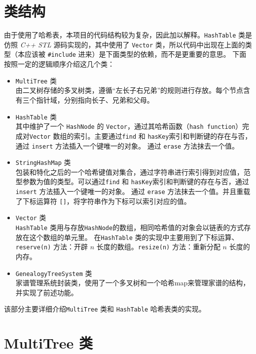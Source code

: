 
\chapter{类结构}
由于使用了哈希表，本项目的代码结构较为复杂，因此加以解释。\lstinline{HashTable} 类是仿照 \emph{C++ STL} 源码实现的，其中使用了%
\lstinline{Vector} 类，所以代码中出现在上面的类型（本应该被 \lstinline{#include} 进来）是下面类型的依赖，而不是更重要的意思。%
下面按照一定的逻辑顺序介绍这几个类：

\begin{itemize}
    \item \lstinline{MultiTree} 类\\
    由二叉树存储的多叉树类，遵循“左长子右兄弟”的规则进行存放。每个节点含有三个指针域，分别指向长子、兄弟和父母。
    \item \lstinline{HashTable} 类\\
    其中维护了一个 \lstinline{HashNode} 的 \lstinline{Vector}，通过其哈希函数（\lstinline{hash function}）完成对\lstinline{Vector}%
    数组的索引。主要通过\lstinline{find} 和 \lstinline{hasKey}索引和判断键的存在与否，通过 \lstinline{insert} 方法插入一个键唯一的对象。%
    通过 \lstinline{erase} 方法抹去一个值。
    \item \lstinline{StringHashMap} 类\\
    包装和特化之后的一个哈希键值对集合，通过字符串进行索引得到对应值，范型参数为值的类型。可以通过\lstinline{find} 和 %
    \lstinline{hasKey}索引和判断键的存在与否，通过 \lstinline{insert} 方法插入一个键唯一的对象。%
    通过 \lstinline{erase} 方法抹去一个值。并且重载了下标运算符 \lstinline{[]}，将字符串作为下标可以索引对应的值。
    \item \lstinline{Vector} 类\\
    \lstinline{HashTable} 类用与存放\lstinline{HashNode}的数组，相同哈希值的对象会以链表的方式存放在这个数组的单元里。%
    在\lstinline{HashTable} 类的实现中主要用到了下标运算、\lstinline{reserve(n)} 方法：开辟 $n$ 长度的数组。\lstinline{resize(n)}%
    方法：重新分配 $n$ 长度的内存。
    \item \lstinline{GenealogyTreeSystem} 类\\
    家谱管理系统封装类，使用了一个多叉树和一个哈希map来管理家谱的结构，并实现了前述功能。
\end{itemize}

该部分主要详细介绍\lstinline{MultiTree} 类和 \lstinline{HashTable} 哈希表类的实现。


\chapter{MultiTree 类}

